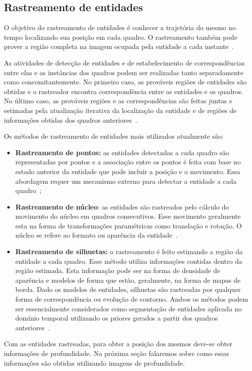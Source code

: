 
\subsection{Rastreamento de entidades}
\label{sec:rastreamento}

	O objetivo do rastreamento de entidades é conhecer a trajetória do mesmo no
	tempo localizando sua posição em cada quadro. O rastreamento também pode
	prover a região completa na imagem ocupada pela entidade a cada
	instante~\cite{yilmaz}.

	As atividades de detecção de entidades e de estabelecimento de correspondências
	entre elas e as instâncias dos quadros podem ser realizadas tanto
	separadamente como concomitantemente. No primeiro caso, as prováveis regiões de
	entidades são obtidas e o rastreador encontra correspondência entre as entidades
	e os quadros. No último caso, as prováveis regiões e as correspondências
	são feitas juntas e estimadas pela atualização iterativa da localização da
	entidade e de regiões de informações obtidas dos quadros
	anteriores~\cite{yilmaz}.\

	Os métodos de rastreamento de entidades mais utilizados atualmente são:

	\begin{itemize}
		\item \textbf{Rastreamento de pontos:} as entidades detectadas a cada quadro
		são representadas por pontos e a associação entre os pontos é feita com base no
		estado anterior da entidade que pode incluir a posição e o movimento. Essa
		abordagem requer um mecanismo externo para detectar a entidade a cada
		quadro~\cite{yilmaz};
		
		\item \textbf{Rastreamento de núcleo}: as entidades são rastreados pelo cálculo
		do movimento do núcleo em quadros consecutivos. Esse movimento
		geralmente esta na forma de transformações paramétricas como translação e
		rotação. O núcleo se refere ao formato ou aparência da entidade~\cite{yilmaz}.
		
		\item \textbf{Rastreamento de silhuetas:} o rastreamento é feito estimando a
		região da entidade a cada quadro. Esse método utiliza informações contidas
		dentro da região estimada. Esta informação pode ser na forma de densidade de
		aparência e modelos de forma que estão, geralmente, na forma de mapas de borda.
		Dado os modelos de entidades, silhuetas são rastreadas por qualquer forma de
		correspondência ou evolução de contorno. Ambos os métodos podem ser
		essencialmente considerados como segmentação de entidades aplicada no domínio
		temporal utilizando os priores gerados a partir dos quadros
		anteriores~\cite{yilmaz}.
	\end{itemize}

Com as entidades rastreadas, para obter a posição dos mesmos deve-se obter
informações de profundidade. Na próxima seção falaremos sobre como essas
informações são obtidas utilizando imagens de profundidade.




